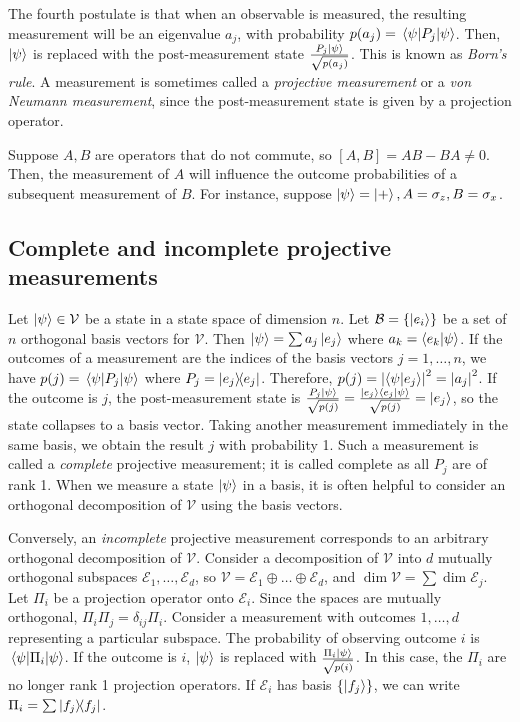 The fourth postulate is that when an observable is measured, the resulting measurement will be an eigenvalue \( a_j \), with probability \( p(a_j) = \ev{P_j}{\psi} \).
Then, \( \ket{\psi} \) is replaced with the post-measurement state \( \frac{P_j \ket{\psi}}{\sqrt{p(a_j)}} \).
This is known as \emph{Born's rule}.
A measurement is sometimes called a \emph{projective measurement} or a \emph{von Neumann measurement}, since the post-measurement state is given by a projection operator.

Suppose \( A, B \) are operators that do not commute, so \( [A,B] = AB - BA \neq 0 \).
Then, the measurement of \( A \) will influence the outcome probabilities of a subsequent measurement of \( B \).
For instance, suppose \( \ket{\psi} = \ket{+}, A = \sigma_z, B = \sigma_x \).

\subsection{Complete and incomplete projective measurements}
Let \( \ket{\psi} \in \mathcal V \) be a state in a state space of dimension \( n \).
Let \( \mathcal B = \qty{\ket{e_i}} \) be a set of \( n \) orthogonal basis vectors for \( \mathcal V \).
Then \( \ket{\psi} = \sum a_j \ket{e_j} \) where \( a_k = \ip{e_k}{\psi} \).
If the outcomes of a measurement are the indices of the basis vectors \( j = 1, \dots, n \), we have \( p(j) = \ev{P_j}{\psi} \) where \( P_j = \op{e_j}{e_j} \).
Therefore, \( p(j) = \abs{\ip{\psi}{e_j}}^2 = \abs{a_j}^2 \).
If the outcome is \( j \), the post-measurement state is \( \frac{P_j \ket{\psi}}{\sqrt{p(j)}} = \frac{\ket{e_j} \ip{e_j}{\psi}}{\sqrt{p(j)}} = \ket{e_j} \), so the state collapses to a basis vector.
Taking another measurement immediately in the same basis, we obtain the result \( j \) with probability 1.
Such a measurement is called a \emph{complete} projective measurement; it is called complete as all \( P_j \) are of rank 1.
When we measure a state \( \ket{\psi} \) in a basis, it is often helpful to consider an orthogonal decomposition of \( \mathcal V \) using the basis vectors.

Conversely, an \emph{incomplete} projective measurement corresponds to an arbitrary orthogonal decomposition of \( \mathcal V \).
Consider a decomposition of \( \mathcal V \) into \( d \) mutually orthogonal subspaces \( \mathcal E_1, \dots, \mathcal E_d \), so \( \mathcal V = \mathcal E_1 \oplus \dots \oplus \mathcal E_d \), and \( \dim \mathcal V = \sum \dim \mathcal E_j \).
Let \( \Pi_i \) be a projection operator onto \( \mathcal E_i \).
Since the spaces are mutually orthogonal, \( \Pi_i \Pi_j = \delta_{ij} \Pi_i \).
Consider a measurement with outcomes \( 1, \dots, d \) representing a particular subspace.
The probability of observing outcome \( i \) is \( \ev{\Pi_i}{\psi} \).
If the outcome is \( i \), \( \ket{\psi} \) is replaced with \( \frac{\Pi_i \ket{\psi}}{\sqrt{p(i)}} \).
In this case, the \( \Pi_i \) are no longer rank 1 projection operators.
If \( \mathcal E_i \) has basis \( \qty{\ket{f_j}} \), we can write \( \Pi_i = \sum \op{f_j}{f_j} \).

